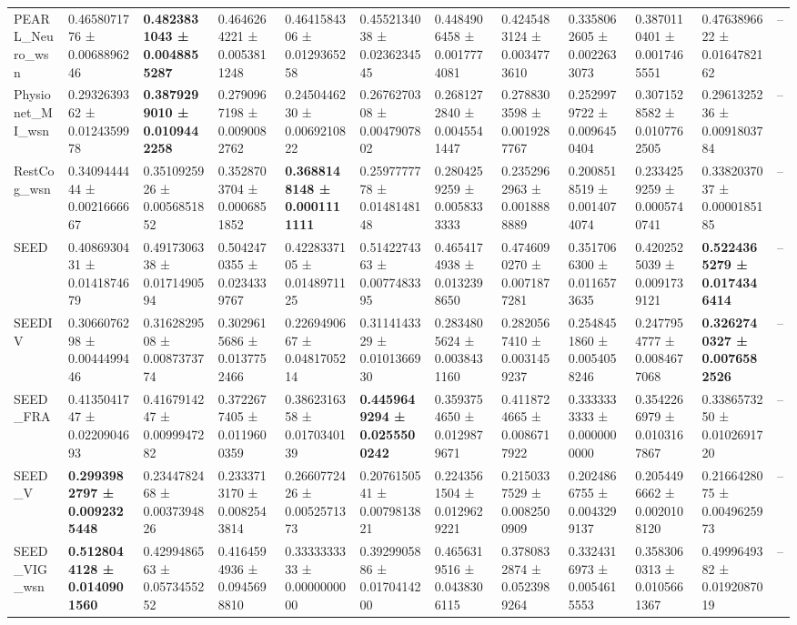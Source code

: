 \begin{table}[htbp]
\begin{tabular}{llllllllllll}
PEARL_Neuro_wsn & 0.4658071776 ± 0.0068896246 & \bfseries 0.4823831043 ± 0.0048855287 & 0.4646264221 ± 0.0053811248 & 0.4641584306 ± 0.0129365258 & 0.4552134038 ± 0.0236234545 & 0.4484906458 ± 0.0017774081 & 0.4245483124 ± 0.0034773610 & 0.3358062605 ± 0.0022633073 & 0.3870110401 ± 0.0017465551 & 0.4763896622 ± 0.0164782162 & -- \\
Physionet_MI_wsn & 0.2932639362 ± 0.0124359978 & \bfseries 0.3879299010 ± 0.0109442258 & 0.2790967198 ± 0.0090082762 & 0.2450446230 ± 0.0069210822 & 0.2676270308 ± 0.0047907802 & 0.2681272840 ± 0.0045541447 & 0.2788303598 ± 0.0019287767 & 0.2529979722 ± 0.0096450404 & 0.3071528582 ± 0.0107762505 & 0.2961325236 ± 0.0091803784 & -- \\
RestCog_wsn & 0.3409444444 ± 0.0021666667 & 0.3510925926 ± 0.0056851852 & 0.3528703704 ± 0.0006851852 & \bfseries 0.3688148148 ± 0.0001111111 & 0.2597777778 ± 0.0148148148 & 0.2804259259 ± 0.0058333333 & 0.2352962963 ± 0.0018888889 & 0.2008518519 ± 0.0014074074 & 0.2334259259 ± 0.0005740741 & 0.3382037037 ± 0.0000185185 & -- \\
SEED & 0.4086930431 ± 0.0141874679 & 0.4917306338 ± 0.0171490594 & 0.5042470355 ± 0.0234339767 & 0.4228337105 ± 0.0148971125 & 0.5142274363 ± 0.0077483395 & 0.4654174938 ± 0.0132398650 & 0.4746090270 ± 0.0071877281 & 0.3517066300 ± 0.0116573635 & 0.4202525039 ± 0.0091739121 & \bfseries 0.5224365279 ± 0.0174346414 & -- \\
SEEDIV & 0.3066076298 ± 0.0044499446 & 0.3162829508 ± 0.0087373774 & 0.3029615686 ± 0.0137752466 & 0.2269490667 ± 0.0481705214 & 0.3114143329 ± 0.0101366930 & 0.2834805624 ± 0.0038431160 & 0.2820567410 ± 0.0031459237 & 0.2548451860 ± 0.0054058246 & 0.2477954777 ± 0.0084677068 & \bfseries 0.3262740327 ± 0.0076582526 & -- \\
SEED_FRA & 0.4135041747 ± 0.0220904693 & 0.4167914247 ± 0.0099947282 & 0.3722677405 ± 0.0119600359 & 0.3862316358 ± 0.0170340139 & \bfseries 0.4459649294 ± 0.0255500242 & 0.3593754650 ± 0.0129879671 & 0.4118724665 ± 0.0086717922 & 0.3333333333 ± 0.0000000000 & 0.3542266979 ± 0.0103167867 & 0.3386573250 ± 0.0102691720 & -- \\
SEED_V & \bfseries 0.2993982797 ± 0.0092325448 & 0.2344782468 ± 0.0037394826 & 0.2333713170 ± 0.0082543814 & 0.2660772426 ± 0.0052571373 & 0.2076150541 ± 0.0079813821 & 0.2243561504 ± 0.0129629221 & 0.2150337529 ± 0.0082500909 & 0.2024866755 ± 0.0043299137 & 0.2054496662 ± 0.0020108120 & 0.2166428075 ± 0.0049625973 & -- \\
SEED_VIG_wsn & \bfseries 0.5128044128 ± 0.0140901560 & 0.4299486563 ± 0.0573455252 & 0.4164594936 ± 0.0945698810 & 0.3333333333 ± 0.0000000000 & 0.3929905886 ± 0.0170414200 & 0.4656319516 ± 0.0438306115 & 0.3780832874 ± 0.0523989264 & 0.3324316973 ± 0.0054615553 & 0.3583060313 ± 0.0105661367 & 0.4999649382 ± 0.0192087019 & -- \\

\end{tabular}
\end{table}
